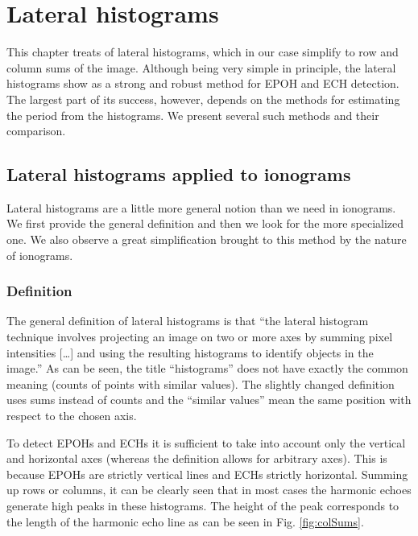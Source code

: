 \chapter{Lateral histograms}
This chapter treats of lateral histograms, which in our case simplify to row and column sums of the image. Although being very simple in principle, the lateral histograms show as a strong and robust method for EPOH and ECH detection. The largest part of its success, however, depends on the methods for estimating the period from the histograms. We present several such methods and their comparison.

\section{Lateral histograms applied to ionograms}
Lateral histograms are a little more general notion than we need in ionograms. We first provide the general definition and then we look for the more specialized one. We also observe a great simplification brought to this method by the nature of ionograms.

\subsection{Definition}
The general definition of lateral histograms is that ``the lateral histogram technique involves projecting an image on two or more axes by summing pixel intensities [\ldots] and using the resulting histograms to identify objects in the image.'' \citep{Davies2004} As can be seen, the title ``histograms'' does not have exactly the common meaning (counts of points with similar values). The slightly changed definition uses sums instead of counts and the ``similar values'' mean the same position with respect to the chosen axis.

To detect EPOHs and ECHs it is sufficient to take into account only the vertical and horizontal axes (whereas the definition allows for arbitrary axes). This is because EPOHs are strictly vertical lines and ECHs strictly horizontal. Summing up rows or columns, it can be clearly seen that in most cases the harmonic echoes generate high peaks in these histograms. The height of the peak corresponds to the length of the harmonic echo line as can be seen in Fig. \ref{fig:colSums}. 

